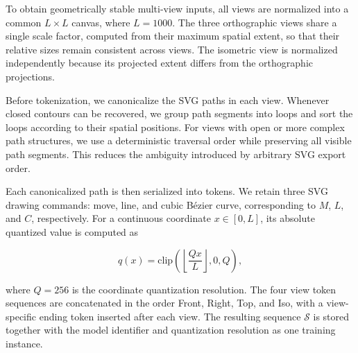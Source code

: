 \documentclass{article}
\begin{document}
To obtain geometrically stable multi-view inputs, all views are normalized into
a common $L \times L$ canvas, where $L=1000$. The three orthographic views share
a single scale factor, computed from their maximum spatial extent, so that their
relative sizes remain consistent across views. The isometric view is normalized
independently because its projected extent differs from the orthographic
projections.

Before tokenization, we canonicalize the SVG paths in each view. Whenever
closed contours can be recovered, we group path segments into loops and sort the
loops according to their spatial positions. For views with open or more complex
path structures, we use a deterministic traversal order while preserving all
visible path segments. This reduces the ambiguity introduced by arbitrary SVG
export order.

Each canonicalized path is then serialized into tokens. We retain three SVG
drawing commands: move, line, and cubic B\'ezier curve, corresponding to
$M$, $L$, and $C$, respectively. For a continuous coordinate
$x \in [0,L]$, its absolute quantized value is computed as

\begin{equation}
    q(x)=\mathrm{clip}\left(
\left\lfloor \frac{Qx}{L} \right\rfloor, 0, Q
\right),
\end{equation}


where $Q=256$ is the coordinate quantization resolution. The four view token
sequences are concatenated in the order Front, Right, Top, and Iso, with a
view-specific ending token inserted after each view. The resulting sequence
$\mathcal{S}$ is stored together with the model identifier and quantization
resolution as one training instance.
\end{document}
